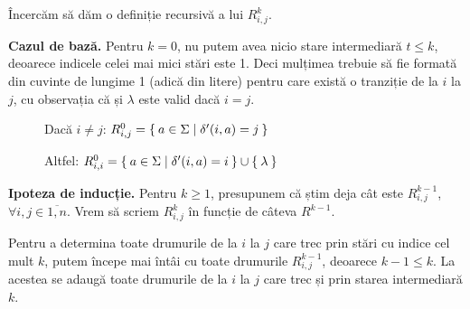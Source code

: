 \documentclass[a4paper, 12pt]{article}
\begin{document}
\clearpage

Încercăm să dăm o definiție recursivă a lui \(R_{i, j}^{k}\).

\medskip

\textbf{Cazul de bază.} Pentru \(k = 0\),  nu putem avea nicio stare intermediară \(t \leq k\),
deoarece indicele celei mai mici stări este 1. Deci mulțimea trebuie să fie formată din cuvinte de lungime 1
(adică din litere) pentru care există o tranziție de la \(i\) la \(j\), cu observația că și \(\lambda\) este valid dacă \(i = j\).
\begin{figure}[!h]
    \centering
    \caption*{Dacă \(i \neq j\): \(R_{i, j}^{0} = \Set{ a \in \Sigma | \delta'(i, a) = j }\)}
    \caption*{Altfel: \(R_{i, i}^{0} = \Set{ a \in \Sigma | \delta'(i, a) = i } \cup \Set{ \lambda }\)}
\end{figure}

\medskip

\textbf{Ipoteza de inducție.} Pentru \(k \geq 1\), presupunem că știm deja cât este
\(R_{i, j}^{k - 1}\), \(\forall i, j \in \overline{1, n}\).
Vrem să scriem \(R_{i, j}^{k}\) în funcție de câteva \(R^{k - 1}\).

Pentru a determina toate drumurile de la \(i\) la \(j\) care trec prin stări cu indice cel mult \(k\), putem începe mai întâi cu toate drumurile \(R_{i, j}^{k - 1}\), deoarece \(k - 1 \leq k\).
La acestea se adaugă toate drumurile de la \(i\) la \(j\) care trec și prin starea intermediară \(k\).
\end{document}
